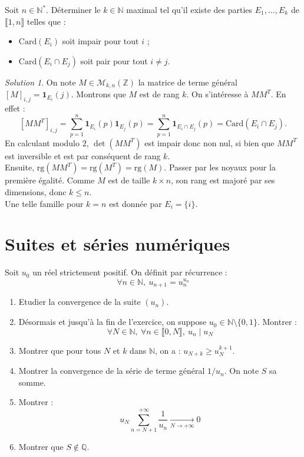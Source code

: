 \documentclass[french]{book}
\newcommand{\N}{\mathbb{N}}
\newcommand{\Z}{\mathbb{Z}}
\newcommand{\Q}{\mathbb{Q}}
\newcommand{\st}{^*}
\newcommand{\card}{\text{Card}}
\newcommand{\rg}{\text{rg}}
\theoremstyle{definition}
\theoremstyle{remark}
\newtheorem*{sol}{Solution}
\begin{document}
\begin{exo}[3]{}
	Soit $n\in\N\st$. Déterminer le $k\in\N$ maximal tel qu'il existe des parties $E_1,\ldots,E_k$ de $\llbracket 1,n\rrbracket$ telles que :
	\begin{itemize}
		\item $\card(E_i)$ soit impair pour tout $i$ ;
		\item $\card(E_i\cap E_j)$ soit pair pour tout $i\ne j$.
	\end{itemize}
\end{exo}
\begin{sol}
	On note $M\in\mathcal{M}_{k,n}(\Z)$ la matrice de terme général $[M]_{i,j}=\textbf{1}_{E_i}(j)$. Montrons que $M$ est de rang $k$. On s'intéresse à $MM^T$. En effet :
	$$[MM^T]_{i,j}=\sum_{p=1}^{n}\textbf{1}_{E_i}(p)\textbf{1}_{E_j}(p)=\sum_{p=1}^{n}\textbf{1}_{E_i\cap E_j}(p)=\card(E_i\cap E_j).$$
	En calculant modulo $2$, $\det(MM^T)$ est impair donc non nul, si bien que $MM^T$ est inversible et est par conséquent de rang $k$. \\
	Ensuite, $\rg(MM^T)=\rg(M^T)=\rg(M)$. Passer par les noyaux pour la première égalité. Comme $M$ est de taille $k\times n$, son rang est majoré par ses dimensions, donc $k\leqslant n$. \\
	Une telle famille pour $k=n$ est donnée par $E_i=\{i\}$.
\end{sol}


\chapter{Suites et séries numériques}

\begin{exo}[0]{}
	Soit $u_0$ un réel strictement positif. On définit par récurrence : $$\forall n\in\N,\ u_{n+1}=u_n^{u_n}$$
	\begin{enumerate}
		\item Etudier la convergence de la suite $(u_n)$.
		\item Désormais et jusqu'à la fin de l'exercice, on suppose $u_0\in\N\setminus\{0,1\}$. Montrer : $$\forall N\in\N,\ \forall n\in\llbracket0,N\rrbracket,\ u_n\mid u_N$$
		\item Montrer que pour tous $N$ et $k$ dans $\N$, on a : $u_{N+k}\geqslant u_N^{k+1}$.
		\item Montrer la convergence de la série de terme général $1/u_n$. On note $S$ sa somme.
		\item Montrer : $$u_N\sum_{n=N+1}^{+\infty}\frac{1}{u_n}\xrightarrow[N\to+\infty]{}0$$
		\item Montrer que $S\notin\Q$.
	\end{enumerate}
\end{exo}
\end{document}
